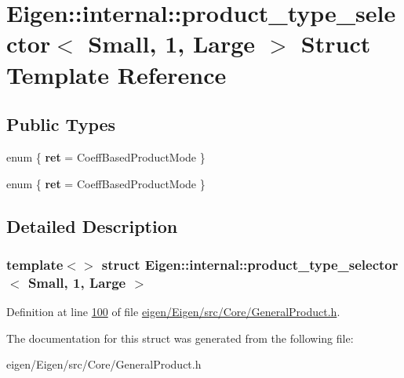 \hypertarget{struct_eigen_1_1internal_1_1product__type__selector_3_01_small_00_011_00_01_large_01_4}{}\section{Eigen\+:\+:internal\+:\+:product\+\_\+type\+\_\+selector$<$ Small, 1, Large $>$ Struct Template Reference}
\label{struct_eigen_1_1internal_1_1product__type__selector_3_01_small_00_011_00_01_large_01_4}
\subsection*{Public Types}
\begin{DoxyCompactItemize}
\item 
\mbox{\label{struct_eigen_1_1internal_1_1product__type__selector_3_01_small_00_011_00_01_large_01_4_a72ade343576bc0d395d18df626f17b67}} 
enum \{ {\bfseries ret} = Coeff\+Based\+Product\+Mode
 \}
\item 
\mbox{\label{struct_eigen_1_1internal_1_1product__type__selector_3_01_small_00_011_00_01_large_01_4_a1f6196abb565d72003e8abc83a786ef6}} 
enum \{ {\bfseries ret} = Coeff\+Based\+Product\+Mode
 \}
\end{DoxyCompactItemize}


\subsection{Detailed Description}
\subsubsection*{template$<$$>$\newline
struct Eigen\+::internal\+::product\+\_\+type\+\_\+selector$<$ Small, 1, Large $>$}



Definition at line \hyperlink{eigen_2_eigen_2src_2_core_2_general_product_8h_source_l00100}{100} of file \hyperlink{eigen_2_eigen_2src_2_core_2_general_product_8h_source}{eigen/\+Eigen/src/\+Core/\+General\+Product.\+h}.



The documentation for this struct was generated from the following file\+:\begin{DoxyCompactItemize}
\item 
eigen/\+Eigen/src/\+Core/\+General\+Product.\+h\end{DoxyCompactItemize}
